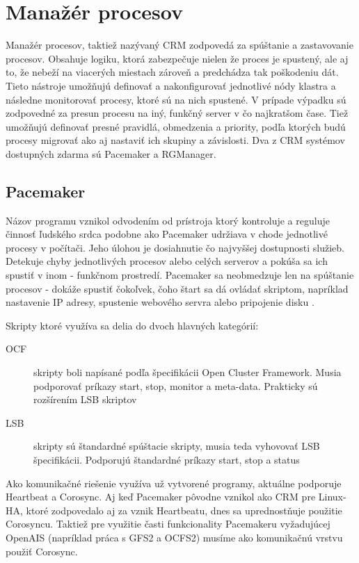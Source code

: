 \section{Manažér procesov}
\label{lbl:sec:crm}
Manažér procesov, taktiež nazývaný \ac{CRM} zodpovedá za spúštanie a zastavovanie procesov. Obsahuje logiku, ktorá zabezpečuje nielen že proces je spustený, ale aj to, že nebeží na viacerých miestach zároveň a predchádza tak poškodeniu dát. Tieto nástroje umožňujú definovať a nakonfigurovať jednotlivé nódy klastra a následne monitorovať procesy, ktoré sú na nich spustené. V prípade výpadku sú zodpovedné za presun procesu na iný, funkčný server v čo najkratšom čase. Tiež umožňujú definovať presné pravidlá, obmedzenia a priority, podľa ktorých budú procesy migrovať ako aj nastaviť ich skupiny a závislosti. Dva z \ac{CRM} systémov dostupných zdarma sú Pacemaker a RGManager.

\subsection{Pacemaker}
Názov programu vznikol odvodením od prístroja ktorý kontroluje a reguluje činnosť ľudského srdca podobne ako Pacemaker udržiava v chode jednotlivé procesy v počítači. Jeho úlohou je dosiahnutie čo najvyššej dostupnosti služieb. Detekuje chyby jednotlivých procesov alebo celých serverov a pokúša sa ich spustiť v inom - funkčnom prostredí. Pacemaker sa neobmedzuje len na spúštanie procesov - dokáže spustiť čokoľvek, čoho štart sa dá ovládať skriptom, napríklad nastavenie IP adresy, spustenie webového servra alebo pripojenie disku \cite{web:ClusterLabs}.

Skripty ktoré využíva sa delia do dvoch hlavných kategórií:
\begin{description}
	\item[OCF] skripty boli napísané podľa špecifikácii Open Cluster Framework. Musia podporovať príkazy start, stop, monitor a meta-data. Prakticky sú rozšírením LSB skriptov
	\item[LSB] skripty sú štandardné spúštacie skripty, musia teda vyhovovať LSB špecifikácii. Podporujú štandardné príkazy start, stop a status
\end{description}

Ako komunikačné riešenie využíva už vytvorené programy, aktuálne podporuje Heartbeat a Corosync. Aj keď Pacemaker pôvodne vznikol ako \ac{CRM} pre Linux-HA, ktoré zodpovedalo aj za vznik Heartbeatu, dnes sa uprednostňuje použitie Corosyncu. Taktiež pre využitie časti funkcionality Pacemakeru vyžadujúcej OpenAIS (napríklad práca s GFS2 a OCFS2) musíme ako komunikačnú vrstvu použiť Corosync.

